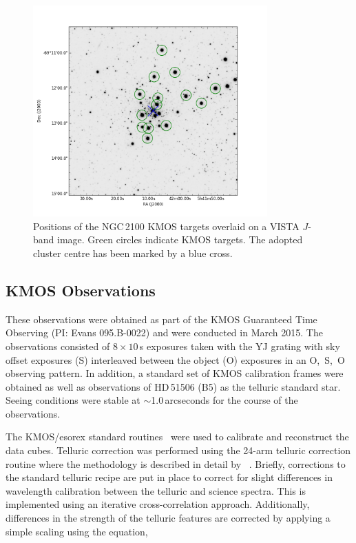 \documentclass[useAMS,usenatbib]{mn2e}
\begin{document}
\begin{figure}
 \includegraphics[width=9.0cm]{NGC2100-targets}
 \caption{Positions of the NGC\,2100 KMOS targets overlaid on a VISTA $J$-band image.
          Green circles indicate KMOS targets.
          The adopted cluster centre has been marked by a blue cross.\label{fig:targets}
          }
\end{figure}

\subsection{KMOS Observations} %
\label{sub:kmos_observations}

These observations were obtained as part of the KMOS Guaranteed Time Observing (PI: Evans 095.B-0022) and were conducted in March 2015.
The observations consisted of $8\times10$\,s exposures taken with the YJ grating with sky offset exposures (S) interleaved between the object (O) exposures in an O,~S,~O observing pattern.
In addition, a standard set of KMOS calibration frames were obtained as well as observations of HD\,51506 (B5) as the telluric standard star.
Seeing conditions were stable at $\sim$1.0\,arcseconds for the course of the observations.

The KMOS/esorex standard routines~\citep[SPARK;][]{2013A&A...558A..56D} were used to calibrate and reconstruct the data cubes.
Telluric correction was performed using the 24-arm telluric correction routine where the methodology is described in detail by
~\citet{2015ApJ...803...14P}.
Briefly, corrections to the standard telluric recipe are put in place to correct for slight differences in wavelength calibration between the telluric and science spectra.
This is implemented using an iterative cross-correlation approach.
Additionally, differences in the strength of the telluric features are corrected by applying a simple scaling using the equation,
\end{document}
